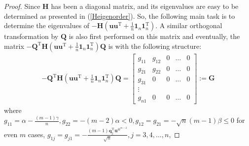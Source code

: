 \begin{proof}
Since  $\mathbf H$  has  been  a  diagonal  matrix,  and its  eigenvalues  are  easy  to be  determined  as  presented  in (\ref{Heigenorder}). 
So,  the  following  main  task  is  to  determine   the  eigenvalues  of  $
 -
\mathbf H
(\mathbf u\mathbf u^{\mathrm T}  
+\frac  1n \mathbf 1_{n}\mathbf 1_{n}^{\mathrm T} )  
$.
A  similar  orthogonal  transformation  by  $\mathbf Q$  is  also  first  performed  on  this   matrix  and 
eventually, 
  the  matrix  $
  -\mathbf Q^{\mathrm T}  
  \mathbf H
  (\mathbf u\mathbf u^{\mathrm T}  
  +\frac  1n \mathbf 1_{n}\mathbf 1_{n}^{\mathrm T} )
  \mathbf Q  
  $  is  with the  following   structure:
\begin{align}\label{QHuuQ}
  -\mathbf Q^{\mathrm T}  
\mathbf H
(\mathbf u\mathbf u^{\mathrm T}  
+\frac  1n \mathbf 1_{n}\mathbf 1_{n}^{\mathrm T} )
\mathbf Q  
=
\begin{bmatrix}
g_{11}    &  g_{12}  &  0  &  \dots  &   0  \\  
g_{21}    &  g_{22}  &  0  &  \dots  &   0  \\  
g_{31}  &  0    &  0  &  \dots  &   0      \\
\vdots                 \\
g_{n1}  &  0    &  0  &  \dots  &   0 
\end{bmatrix}
:=
\mathbf G
\end{align}
where
$ g_{11} = 
 \alpha - \frac 
 {(m-1)\gamma}
 {n} , g_{22} =-(m-2)\alpha <0, 
g_{12} = g_{21} = -\sqrt {n}(m-1)\beta  \le 0 $  for  even $m$  cases, 
$g_{1j} = g_{j1} = -\frac{  (m-1) \mathbf q_{j}^{\mathrm T} \mathbf u ^{\circledast^{m-2}} }{ \sqrt{n}} , j=3,4,\dots, n$,






\end{proof}
